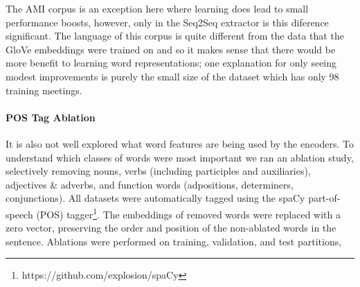 The AMI corpus is an exception here where learning does lead to small
performance boosts, however, only in the Seq2Seq extractor is this diference 
significant. The language of this corpus is quite different from the 
data that the GloVe embeddings were trained on and so it makes sense 
that  there would be more benefit to learning word representations; one
explanation for only seeing modest improvements is purely the small size
of the dataset which has only 98 training meetings.



\paragraph{POS Tag Ablation}
It is also not well explored what word features are being used by the encoders.
To understand which classes of words were most important we ran an ablation
study, selectively removing nouns, verbs 
(including participles and auxiliaries), adjectives \& adverbs, and 
function words (adpositions, determiners, conjunctions).
All datasets were automatically tagged using
the spaCy part-of-speech (POS)
tagger\footnote{https://github.com/explosion/spaCy}.   
The embeddings of removed words were replaced with a zero vector,
preserving the order and position of the non-ablated words in the sentence.
Ablations were performed on training, validation, and test partitions,
